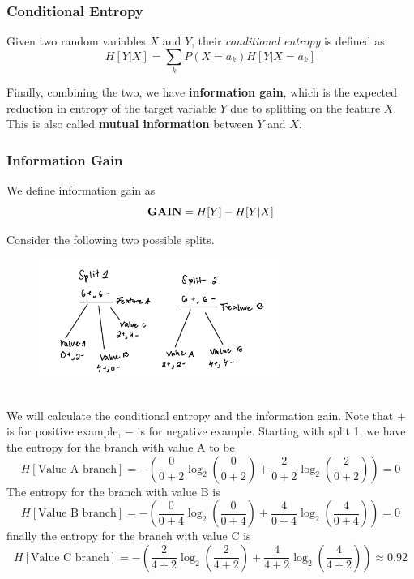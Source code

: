 \documentclass[11 pt]{scrartcl}
\begin{document}
\subsubsection{Conditional Entropy}
\begin{definition}
Given two random variables $X$ and $Y$, their \emph{conditional entropy} is defined as 
\[H[Y|X] = \sum_k P(X = a_k)H[Y|X = a_k] \]
\end{definition}
Finally, combining the two, we have \textbf{information gain}, which is the expected reduction in entropy of the target variable $Y$ due to splitting on the feature $X$. This is also called \textbf{mutual information} between $Y$ and $X$.
\subsubsection{Information Gain} 
\begin{definition}
We define information gain as
\[\text{\textbf{GAIN}} = H[Y] - H[Y|X] \]
\end{definition}
\newpage
Consider the following two possible splits.
\begin{figure}[h!]
    \centering
    \includegraphics[width=0.7\textwidth]{images/infogain_ex.png} %
\end{figure}
\\We will calculate the conditional entropy and the information gain. Note that $+$ is for positive example, $-$ is for negative example. Starting with split 1, we have the entropy for the branch with value A to be
$$
H[\text{Value A branch}] = -\left(\frac{0}{0 + 2}\log_2\left(\frac{0}{0 + 2}\right) + \frac{2}{0 + 2}\log_2\left(\frac{2}{0 + 2} \right) \right) = 0
$$
The entropy for the branch with value B is
$$
H[\text{Value B branch}] = -\left(\frac{0}{0 + 4}\log_2\left(\frac{0}{0 + 4}\right) + \frac{4}{0 + 4}\log_2\left(\frac{4}{0 + 4} \right) \right) = 0
$$
finally the entropy for the branch with value C is
$$
H[\text{Value C branch}] = -\left(\frac{2}{4 + 2}\log_2\left(\frac{2}{4 + 2}\right) + \frac{4}{4 + 2}\log_2\left(\frac{4}{4 + 2} \right) \right) \approx 0.92
$$
\end{document}
